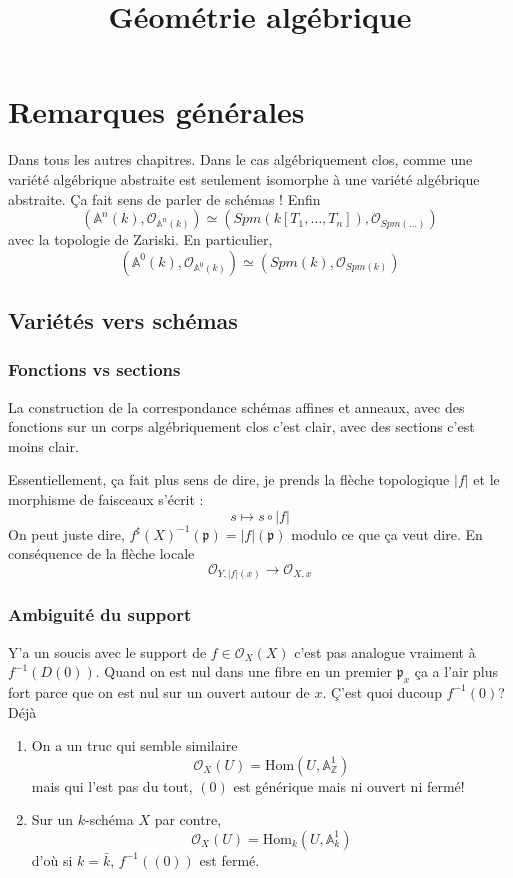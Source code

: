 \documentclass[a4paper,12pt]{book}
\title{Géométrie algébrique}
\date{}
\newcommand{\Z}{\mathbb{Z}}
\newcommand{\A}{\mathbb{A}}
\newcommand{\Or}{\mathcal{O}}
\newcommand{\Hom}{\textrm{Hom}}
\newcommand{\p}{\mathfrak{p}}
\theoremstyle{plain}
\theoremstyle{definition}
\theoremstyle{remark}
\begin{document}
\maketitle
\tableofcontents



\chapter{Remarques générales}
Dans tous les autres chapitres. Dans le cas algébriquement clos, 
comme une variété algébrique abstraite est seulement isomorphe à une
variété algébrique abstraite. Ça fait sens de parler de schémas !
Enfin 
\[(\A^n(k),\Or_{\A^n(k)})\simeq (Spm(k[T_1,\ldots, T_n]),\Or_{Spm(...)})
\]
avec la topologie de Zariski. En particulier, 
\[(\A^0(k), \Or_{\A^0(k)})\simeq (Spm(k), \Or_{Spm(k)})\]

\section{Variétés vers schémas}
\subsection{Fonctions vs sections}
La construction de la correspondance schémas
affines et anneaux, avec des fonctions sur un corps algébriquement clos
c'est clair, avec des sections c'est moins clair.

Essentiellement, ça fait plus sens de dire, je prends la flèche
topologique $|f|$ et le morphisme de faisceaux s'écrit :
\[s\mapsto s\circ |f|\]
On peut juste dire, $f^\sharp(X)^{-1}(\p)=|f|(\p)$ modulo ce que ça veut
dire. En conséquence de la flèche locale 
\[\Or_{Y,|f|(x)}\to \Or_{X,x}\]

\subsection{Ambiguité du support}
Y'a un soucis avec le support de $f\in \Or_X(X)$ c'est pas analogue
vraiment à $f^{-1}(D(0))$. Quand on est nul dans une fibre en un premier
$\p_x$ ça a l'air plus fort parce que on est nul sur un ouvert autour
de $x$. Ç'est quoi ducoup $f^{-1}(0)$? Déjà 
\begin{enumerate}
    \item On a un truc qui semble similaire 
	\[\Or_X(U)=\Hom(U,\A^1_\Z)\]
	mais qui l'est pas du tout, $(0)$ est générique mais ni ouvert
	ni fermé!
    \item Sur un $k$-schéma $X$ par contre, 
	\[\Or_X(U)=\Hom_k(U,\A^1_k)\]
	d'où si $k=\bar k$, $f^{-1}((0))$ est fermé.
\end{enumerate}
\end{document}
